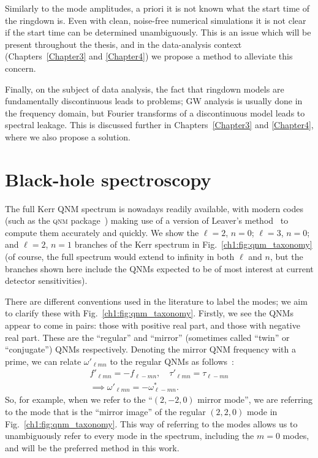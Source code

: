 Similarly to the mode amplitudes, a priori it is not known what the start time of the ringdown is.
Even with clean, noise-free numerical simulations it is not clear if the start time can be determined unambiguously.
This is an issue which will be present throughout the thesis, and in the data-analysis context (Chapters~\ref{Chapter3} and \ref{Chapter4}) we propose a method to alleviate this concern.

Finally, on the subject of data analysis, the fact that ringdown models are fundamentally discontinuous leads to problems; GW analysis is usually done in the frequency domain, but Fourier transforms of a discontinuous model leads to spectral leakage.
This is discussed further in Chapters~\ref{Chapter3} and \ref{Chapter4}, where we also propose a solution.

\section{Black-hole spectroscopy}
\label{ch1:sec:bh_spectroscopy}

The full Kerr QNM spectrum is nowadays readily available, with modern codes (such as the \textsc{qnm} package~\cite{Stein:2019mop}) making use of a version of Leaver's method~\cite{Leaver:1985ax} to compute them accurately and quickly.
We show the $\ell = 2$, $n = 0$; $\ell = 3$, $n = 0$; and $\ell = 2$, $n = 1$ branches of the Kerr spectrum in Fig.~\ref{ch1:fig:qnm_taxonomy} (of course, the full spectrum would extend to infinity in both $\ell$ and $n$, but the branches shown here include the QNMs expected to be of most interest at current detector sensitivities).  

There are different conventions used in the literature to label the modes; we aim to clarify these with Fig.~\ref{ch1:fig:qnm_taxonomy}.
Firstly, we see the QNMs appear to come in pairs: those with positive real part, and those with negative real part.
These are the ``regular'' and ``mirror'' (sometimes called ``twin'' or ``conjugate'') QNMs respectively.
Denoting the mirror QNM frequency with a prime, we can relate $\omega'_{\ell m n}$ to the regular QNMs as follows~\cite{Berti:2005ys}:
\begin{gather}
    f'_{\ell m n} = -f_{\ell -m n}, \quad \tau'_{\ell m n} = \tau_{\ell -m n} \nonumber \\
    \implies \omega'_{\ell m n} = - \omega_{\ell -mn}^*.
    \label{ch1:eq:mirror}
\end{gather}
So, for example, when we refer to the ``$(2,-2,0)$ mirror mode'', we are referring to the mode that is the ``mirror image'' of the regular $(2,2,0)$ mode in Fig.~\ref{ch1:fig:qnm_taxonomy}.
This way of referring to the modes allows us to unambiguously refer to every mode in the spectrum, including the $m=0$ modes, and will be the preferred method in this work.

